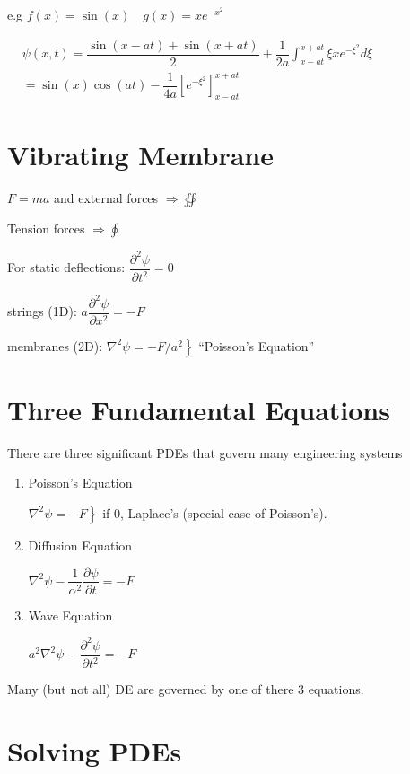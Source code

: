 \documentclass{report}
\begin{document}
e.g $f(x)=\sin(x)\quad g(x)=xe^{-x^2}$

$\begin{aligned}
    & \psi(x, t)=\dfrac{\sin (x-a t)+\sin (x+a t)}{2}+\dfrac{1}{2 a} \displaystyle\int_{x-a t}^{x+a t} \xi x e^{-\xi^{2}} d \xi\\
    & =\sin (x) \cos (a t)-\dfrac{1}{4 a}\left[e^{-\xi^{2}}\right]_{x-a t}^{x+a t}
\end{aligned}$


\section{Vibrating Membrane}


$F=m a$ and external forces $\Rightarrow \oiint$

Tension forces $\Rightarrow \oint$

For static deflections: $\dfrac{\partial^{2} \psi}{\partial t^{2}}=0$

strings (1D): $a \dfrac{\partial^{2} \psi}{\partial x^{2}}=-F$

membranes (2D): $\left.\nabla^{2} \psi=-F / a^{2}\right\}$ ``Poisson's Equation''

\section{Three Fundamental Equations}
There are three significant PDEs that govern many engineering systems
\begin{enumerate}
  \item Poisson's Equation

  $\left.\nabla^{2} \psi=-F\right\}$ if 0, Laplace's (special case of Poisson's).
  
  \item Diffusion Equation

  $\nabla^{2} \psi-\dfrac{1}{\alpha^{2}} \dfrac{\partial \psi}{\partial t}=-F$

  \item Wave Equation

  $a^{2} \nabla^{2} \psi-\dfrac{\partial^{2} \psi}{\partial t^{2}}=-F$
\end{enumerate}


Many (but not all) DE are governed by one of there 3 equations.

\section{Solving PDEs}
\end{document}
